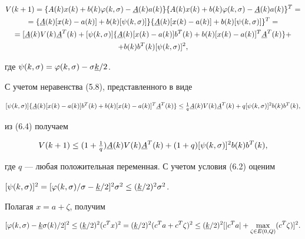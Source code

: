 \begin{multline}


V(k+1)=\{A(k)x(k)+b(k)\varphi(k,\sigma)-\uA(k) a(k)\}


\{A(k)x(k)+b(k)\varphi(k,\sigma)-\uA(k) a(k)\}^T=\\


%


=\{\uA(k)[x(k)-a(k)]+b(k)[\psi(k,\sigma)]\}


\{\uA(k)[x(k)-a(k)]+b(k)[\psi(k,\sigma)]\}^T = \\


%


=[\uA(k) V(k) \uA^T(k)+[\psi(k,\sigma)]\{\uA(k)[x(k)-a(k)]b^T(k)+b(k)


[x(k)-a(k)]^T\uA^T(k)\}+ \\


%


+b(k)b^T(k)[\psi(k,\sigma)]^2,


\end{multline}


где $\psi(k,\sigma)=\varphi(k,\sigma)-\sigma\underline k/2$.





С учетом неравенства (5.8), представленного в виде


$$


[\psi(k,\sigma)]\{\uA(k)[x(k)-a(k)]b^T(k)+b(k)[x(k)-a(k)]^T


\uA^T(k)\}\le\tfrac{1}{q}\uA(k)V(k)\uA^T(k)+


q[\psi(k,\sigma)]^2b(k)b^T(k),


$$


из (6.4) получаем


\begin{equation}


V(k+1)\le(1+\tfrac{1}{q})\uA(k)V(k)\uA^T(k)+(1+q)[\psi(k,\sigma)]^2


b(k)b^T(k),


\end{equation}


где $q$ --- любая положительная переменная. С учетом условия (6.2) оценим


$[\psi(k,\sigma)]^2=[\varphi(k,\sigma)/\sigma-\uk/2]^2\sigma^2


\le(\uk/2)^2\sigma^2$.


Полагая $x=a+\zeta$, получим


\begin{equation}


[\varphi(k,\sigma)-\uk\sigma(k)/2]^2\le(\uk/2)^2(c^T x)^2=


(\uk/2)^2(c^Ta+c^T\zeta)^2 \le(\uk/2)^2[|c^T a|+


\max_{\zeta\in E(0,Q)}(c^T\zeta)]^2.


\end{equation}


